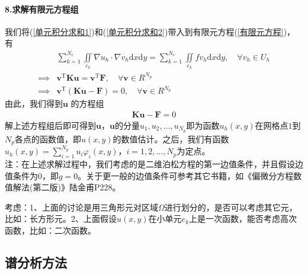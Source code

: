            \paragraph{8.求解有限元方程组}
            我们将(\ref{单元积分求和1})和(\ref{单元积分求和2})带入到有限元方程(\ref{有限元方程})，有
            \begin{align*}
                &\sum _{k = 1}^{N_e} \iint\limits_{e_k} \nabla u_h \cdot \nabla v_h \mathrm{d}x\mathrm{d}y =
                    \sum _{k = 1}^{N_e} \iint\limits_{e_k} f v_h \mathrm{d}x\mathrm{d}y ,\quad \forall v_h\in U_h \\
                \implies {} &\mathbf{v}^\mathrm{T} \mathbf{K}\mathbf{u} = \mathbf{v}^\mathrm{T} \mathbf{F} ,\quad \forall \mathbf{v}\in R^{N_p}  \\
                \implies {} &\mathbf{v}^\mathrm{T}(\mathbf{K}\mathbf{u} -  \mathbf{F}) = 0,\quad \forall \mathbf{v}\in R^{N_p}
            \end{align*}
            由此，我们得到$\mathbf{u}$ 的方程组
            \begin{align*}
                \mathbf{K}\mathbf{u} -  \mathbf{F} = 0
            \end{align*}
            解上述方程组后即可得到$\mathbf{u}$，$\mathbf{u}$的分量$u_1,u_2,\dots,u_{N_p}$即为函数$u_h(x,y)$在网格点$1$到$N_p$各点的函数值，即$u(x,y)$的数值估计。之后，我们有函数$u_h(x,y) = \sum_{i  =1}^{N_p} u_i \varphi_i(x,y)$，$i = 1,2,\dots,N_p$为定点。\\
           注：在上述求解过程中，我们考虑的是二维泊松方程的第一边值条件，并且假设边值条件为$0$，即$g = 0$。关于更一般的边值条件可参考其它书籍，如《偏微分方程数值解法(第二版)》陆金甫P228。
           \par
           考虑：1、上面的讨论是用三角形元对区域$\Omega$进行划分的，是否可以考虑其它元，比如：长方形元。2、上面假设$u(x,y)$在小单元$e_k$上是一次函数，能否考虑高次函数，比如：二次函数。

    \subsection{谱分析方法}
